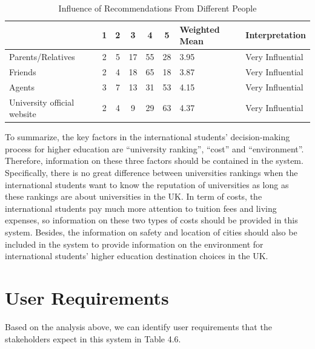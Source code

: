 \begin{table}[H]
\centering
\caption{Influence of Recommendations From Different People
}
\label{my-label}
\begin{tabular}{|p{4cm}|c|c|c|c|c|p{2cm}|p{3cm}|}
\hline
                            & \textbf{1} & \textbf{2} & \textbf{3} & \textbf{4} & \textbf{5} & \textbf{Weighted Mean} & \textbf{Interpretation} \\ \hline
Parents/Relatives           & 2          & 5          & 17         & 55         & 28         & 3.95                   & Very Influential        \\ \hline
Friends                     & 2          & 4          & 18         & 65         & 18         & 3.87                   & Very Influential        \\ \hline
Agents                      & 3          & 7          & 13         & 31         & 53         & 4.15                   & Very Influential        \\ \hline
University official website & 2          & 4          & 9          & 29         & 63         & 4.37                   & Very Influential        \\ \hline
\end{tabular}
\end{table}


To summarize, the key factors in the international students’ decision-making process for higher education are “university ranking”, “cost” and “environment”. Therefore, information on these three factors should be contained in the system. Specifically, there is no great difference between universities rankings when the international students want to know the reputation of universities as long as these rankings are about universities in the UK. In term of costs, the international students pay much more attention to tuition fees and living expenses, so information on these two types of costs should be provided in this system. Besides, the information on safety and location of cities should also be included in the system to provide information on the environment for international students’ higher education destination choices in the UK. 

\section{User Requirements
}

Based on the analysis above, we can identify user requirements that the stakeholders expect in this system in Table 4.6.

